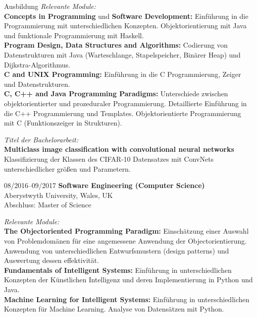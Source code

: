 \documentclass[11pt,a4paper,oneside,final]{scrartcl}
\begin{document}
\begin{cv}
\begin{cvlist}{Ausbildung}
            \textit{Relevante Module:}\\[0.5em]
            \textbf{Concepts in Programming} und \textbf{Software Development:} Einführung in die Programmierung mit unterschiedlichen Konzepten. Objektorientierung mit Java und funktionale Programmierung mit Haskell.\\[0.5em]
            \textbf{Program Design, Data Structures and Algorithms:} Codierung von Datenstrukturen mit Java (Warteschlange, Stapelspeicher, Binärer Heap) und Dijkstra-Algorithmus.\\[0.5em]
            \textbf{C and UNIX Programming:} Einführung in die C Programmierung, Zeiger und Datenstrukturen.\\[0.5em]
            \textbf{C, C++ and Java Programming Paradigms:} Unterschiede zwischen objektorientierter und prozeduraler Programmierung. Detaillierte Einführung in die C++ Programmierung und Templates. Objektorientierte Programmierung mit C (Funktionszeiger in Strukturen).

            \textit{Titel der Bachelorarbeit:}\\[0.5em]
            \textbf{Multiclass image classification with convolutional neural networks}\\
            Klassifizierung der Klassen des CIFAR-10 Datensatzes mit ConvNets unterschiedlicher größen und Parametern.

        \item[08/2016--09/2017] \textbf{Software Engineering (Computer Science)}\\
            Aberystwyth University, Wales, UK\\
            Abschluss: Master of Science

            \textit{Relevante Module:}\\[0.5em]
            \textbf{The Objectoriented Programming Paradigm:} Einschätzung einer Auswahl von Problemdomänen für eine angemessene Anwendung der Objectorientierung. Anwendung von unterschiedlichen Entwurfsmustern (design patterns) und Auswertung dessen effektivität.\\[0.5em]
            \textbf{Fundamentals of Intelligent Systems:} Einführung in unterschiedlichen Konzepten der Künstlichen Intelligenz und deren Implementierung in Python und Java.\\[0.5em]
            \textbf{Machine Learning for Intelligent Systems:} Einführung in unterschiedlichen Konzepten für Machine Learning. Analyse von Datensätzen mit Python.


\end{cvlist}
\end{cv}
\end{document}
